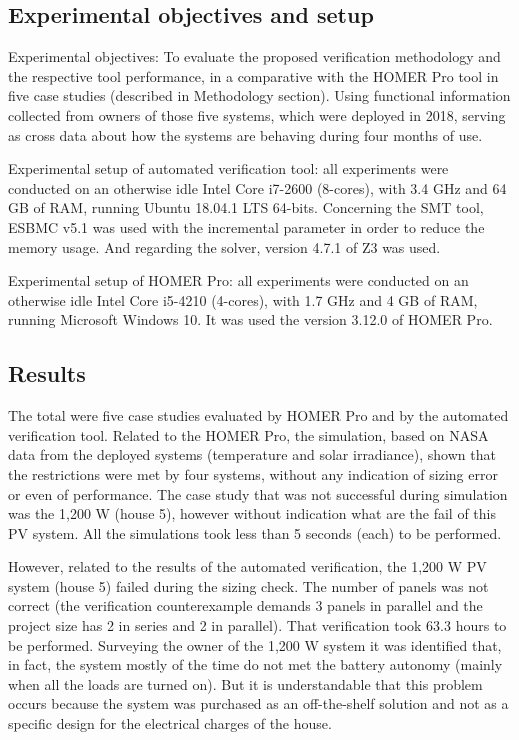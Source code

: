 \documentclass[journal]{IEEEtran}
\begin{document}
\subsection{Experimental objectives and setup}
Experimental objectives: To evaluate the proposed verification methodology and the respective tool performance, in a comparative with the HOMER Pro tool in five case studies (described in Methodology section). Using functional information collected from owners of those five systems, which were deployed in 2018, serving as cross data about how the systems are behaving during four months of use.
%
%
%

Experimental setup of automated verification tool: all experiments were conducted on an otherwise idle Intel Core i7-2600 (8-cores), with 3.4 GHz and 64 GB of RAM, running Ubuntu 18.04.1 LTS 64-bits. Concerning the SMT tool, ESBMC v5.1 was used with the incremental parameter in order to reduce the memory usage. And regarding the solver, version 4.7.1 of Z3 was used.

Experimental setup of HOMER Pro: all experiments were conducted on an otherwise idle Intel Core i5-4210 (4-cores), with 1.7 GHz and 4 GB of RAM, running Microsoft Windows 10. It was used the version 3.12.0 of HOMER Pro.

\subsection{Results}
The total were five case studies evaluated by HOMER Pro and by the automated verification tool. Related to the HOMER Pro, the simulation, based on NASA data from the deployed systems (temperature and solar irradiance), shown that the restrictions were met by four systems, without any indication of sizing error or even of performance. The case study that was not successful during simulation was the 1,200 W (house 5), however without indication what are the fail of this PV system. All the simulations took less than 5 seconds (each) to be performed.

However, related to the results of the automated verification, the 1,200 W PV system (house 5) failed during the sizing check. The number of panels was not correct (the verification counterexample demands 3 panels in parallel and the project size has 2 in series and 2 in parallel). That verification took 63.3 hours to be performed. Surveying the owner of the 1,200 W system it was identified that, in fact, the system mostly of the time do not met the battery autonomy (mainly when all the loads are turned on). But it is understandable that this problem occurs because the system was purchased as an off-the-shelf solution and not as a specific design for the electrical charges of the house.
\end{document}
